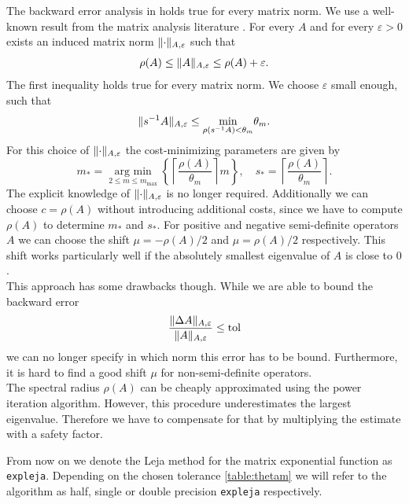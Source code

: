 \documentclass{scrartcl}
\begin{document}
The backward error analysis in \cite{lejarev} holds true for every matrix norm.
We use a well-known result from the matrix analysis literature \cite[Lemma 5.6.10.]{matrixanalysis}. For every $A$ and for every $\varepsilon>0$ exists an induced matrix norm $\lVert\cdot\rVert_{A,\varepsilon}$ such that
\[
	\rho(A) \le \lVert A\rVert_{A,\varepsilon} \le \rho(A) + \varepsilon. 
\]
The first inequality holds true for every matrix norm. We choose $\varepsilon$ small enough, such that
\[
	\lVert s^{-1}A\rVert_{A,\varepsilon} \le \underset{\rho(s^{-1}A) < \theta_m}{\min}\theta_m.
\]
For this choice of $\lVert\cdot\rVert_{A,\varepsilon}$ the cost-minimizing parameters are given by
\[
	m_* = \underset{2\le m\le m_{\operatorname{max}}}{\operatorname{arg\ min}}  \left\{{\left\lceil{\frac{\rho(A)}{\theta_m}}\right\rceil}m\right\}, \quad
	s_* =  \left\lceil{\frac{\rho(A)}{\theta_m}}\right\rceil.
\]
The explicit knowledge of $\lVert\cdot\rVert_{A,\varepsilon}$ is no longer required. Additionally we can choose $c=\rho(A)$ without introducing additional costs, since we have to compute $\rho(A)$ to determine $m_*$ and $s_*$. 
For positive and negative semi-definite operators $A$ we can choose the shift $\mu = -\rho(A)/2$ and $\mu = \rho(A)/2$ respectively. This shift works particularly well if the absolutely smallest eigenvalue of $A$ is close to $0$.\\
This approach has some drawbacks though. While we are able to bound the backward error
\[
	\frac{\lVert\Delta A\rVert_{A,\varepsilon}}{\lVert A\rVert_{A,\varepsilon}} \le \operatorname{tol}  
\]
we can no longer specify in which norm this error has to be bound. Furthermore, it is hard to find a good shift $\mu$ for non-semi-definite operators.\\
The spectral radius $\rho(A)$ can be cheaply approximated using the power iteration algorithm. However, this procedure underestimates the largest eigenvalue. Therefore we have to compensate for that by multiplying the estimate with a safety factor. 

From now on we denote the Leja method for the matrix exponential function as \texttt{expleja}. Depending on the chosen tolerance \ref{table:thetam} we will refer to the algorithm as half, single or double precision \texttt{expleja} respectively.
\end{document}
